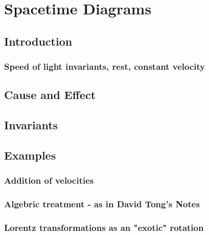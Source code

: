 
\section{Spacetime Diagrams}

\subsection{Introduction}
\subsubsection{Speed of light invariants, rest, constant velocity}

\subsection{Cause and Effect}

\subsection{Invariants}

\subsection{Examples}
\subsubsection{Addition of velocities}
\subsubsection{Algebric treatment - as in David Tong's Notes}
\subsubsection{Lorentz transformations as an "exotic" rotation}
